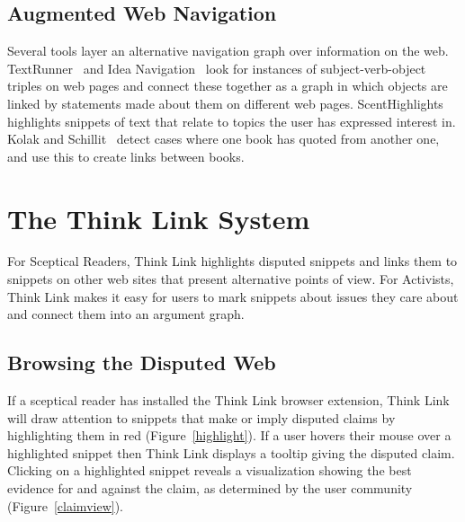 \documentclass{chi2009}
\newcommand{\todo}[1]{}
\begin{document}
\todo{Ask Nicholas if he would like to read the paper}

\subsection{Augmented Web Navigation}

Several tools layer an alternative navigation graph over information on the web. TextRunner~\cite{Etzioni2008} and Idea Navigation~\cite{Etzioni2008} look for instances of subject-verb-object triples on web pages and connect these together as a graph in which objects are linked by statements made about them on different web pages. ScentHighlights~\cite{Chi2005a} highlights snippets of text that relate to topics the user has expressed interest in. Kolak and Schillit~\cite{Kolak2008} detect cases where one book has quoted from another one, and use this to create links between books. 

% 

% 

\section{The Think Link System}

For Sceptical Readers, Think Link highlights disputed snippets and links them to snippets on other web sites that present alternative points of view. For Activists, Think Link makes it easy for users to mark snippets about issues they care about and connect them into an argument graph.

\subsection{Browsing the Disputed Web}

If a sceptical reader has installed the Think Link browser extension, Think Link will draw attention to snippets that make or imply disputed claims by highlighting them in red (Figure~\ref{highlight}). If a user hovers their mouse over a highlighted snippet then Think Link displays a tooltip giving the disputed claim. Clicking on a highlighted snippet reveals a visualization showing the best evidence for and against the claim, as determined by the user community (Figure~\ref{claimview}).
\end{document}

